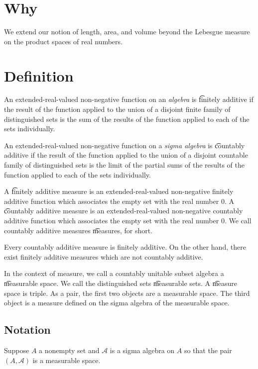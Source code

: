 
\section*{Why}

We extend our notion of length, area, and volume beyond the Lebesgue measure on the product spaces of real numbers.

\section*{Definition}

An extended-real-valued non-negative function on an \textit{algebra} is \t{finitely additive} if the result of the function applied to the union of a disjoint finite family of distinguished sets is the sum of the results of the function applied to each of the sets individually.

An extended-real-valued non-negative function on a \textit{sigma algebra} is \t{countably additive} if the result of the function applied to the union of a disjoint countable family of distinguished sets is the limit of the partial sums of the results of the function applied to each of the sets individually.

A \t{finitely additive measure} is an extended-real-valued non-negative finitely additive function which associates the empty set with the real number $0$.
A \t{countably additive measure} is an extended-real-valued non-negative countably additive function which associates the empty set with the real number $0$.
We call countably additive measures \t{measures}, for short.

Every countably additive measure is finitely additive.
On the other hand, there exist finitely additive measures which are not countably additive.

In the context of measure, we call a countably unitable subset algebra a \t{measurable space}.
We call the distinguished sets \t{measurable} sets.
A \t{measure space} is triple.
As a pair, the first two objects are a measurable space.
The third object is a measure defined on the sigma algebra of the measurable space.

\subsection*{Notation}

Suppose $A$ a nonempty set and $\mathcal{A} $ is a sigma algebra on $A$ so that the pair $(A, \mathcal{A} )$ is a measurable space.

